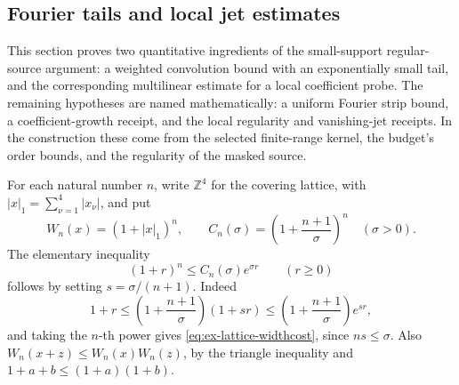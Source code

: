 \subsection{Fourier tails and local jet estimates}
\label{sec:ex-lattice-trace-row-jet-estimates}

This section proves two quantitative ingredients of the small-support
regular-source argument: a weighted convolution bound with an exponentially
small tail, and the corresponding multilinear estimate for a local
coefficient probe. The remaining hypotheses are named mathematically: a
uniform Fourier strip bound, a coefficient-growth receipt, and the local
regularity and vanishing-jet receipts. In the construction these come from
the selected finite-range kernel, the budget's order bounds, and the
regularity of the masked source.

For each natural number \(n\), write \(\mathbb Z^4\) for the covering lattice, with
\(|x|_1=\sum_{\nu=1}^4|x_\nu|\), and put
\[
  W_n(x)=(1+|x|_1)^n,\qquad
  C_n(\sigma)=\left(1+\frac{n+1}{\sigma}\right)^n
  \quad(\sigma>0).
 \]
The elementary inequality
\begin{equation}
 (1+r)^n\le C_n(\sigma)e^{\sigma r}\qquad(r\ge0)
 \label{eq:ex-lattice-widthcost}
 \end{equation}
follows by setting \(s=\sigma/(n+1)\). Indeed
\[
 1+r\le\left(1+\frac{n+1}{\sigma}\right)(1+sr)
       \le\left(1+\frac{n+1}{\sigma}\right)e^{sr},
 \]
and taking the \(n\)-th power gives \eqref{eq:ex-lattice-widthcost}, since \(ns\le\sigma\).
Also \(W_n(x+z)\le W_n(x)W_n(z)\), by the triangle inequality and
\(1+a+b\le(1+a)(1+b)\).

